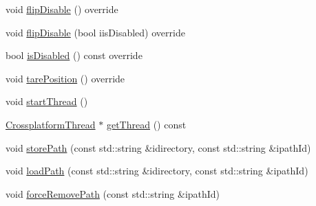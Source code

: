 \begin{DoxyCompactItemize}
\item 
void \mbox{\hyperlink{classokapi_1_1AsyncMotionProfileController_a7069b2b7373aec21c84369392d8d34d8}{flip\+Disable}} () override
\item 
void \mbox{\hyperlink{classokapi_1_1AsyncMotionProfileController_a3dc30b14b36f1fc1fc61c9c45ced002e}{flip\+Disable}} (bool iis\+Disabled) override
\item 
bool \mbox{\hyperlink{classokapi_1_1AsyncMotionProfileController_a04bc0f7be2c116163bfbef0571dec2ef}{is\+Disabled}} () const override
\item 
void \mbox{\hyperlink{classokapi_1_1AsyncMotionProfileController_afc3476c87e3428f9f166273688e45249}{tare\+Position}} () override
\item 
void \mbox{\hyperlink{classokapi_1_1AsyncMotionProfileController_af54f59d0269d84b12eb148271e349646}{start\+Thread}} ()
\item 
\mbox{\hyperlink{classCrossplatformThread}{Crossplatform\+Thread}} $\ast$ \mbox{\hyperlink{classokapi_1_1AsyncMotionProfileController_aaac5113b3567c28dc1c5ba0dcf7facdd}{get\+Thread}} () const
\item 
void \mbox{\hyperlink{classokapi_1_1AsyncMotionProfileController_ad588aa51d62169159ff5e4b05ad3982c}{store\+Path}} (const std\+::string \&idirectory, const std\+::string \&ipath\+Id)
\item 
void \mbox{\hyperlink{classokapi_1_1AsyncMotionProfileController_a87c74350a819a3a322321be787c32d1f}{load\+Path}} (const std\+::string \&idirectory, const std\+::string \&ipath\+Id)
\item 
void \mbox{\hyperlink{classokapi_1_1AsyncMotionProfileController_ace5f9053d3455e6f5e69c63f1196521e}{force\+Remove\+Path}} (const std\+::string \&ipath\+Id)
\end{DoxyCompactItemize}
